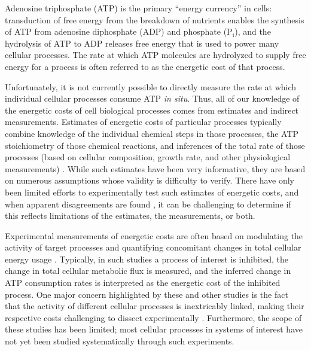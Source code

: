 \documentclass{compactarticle}
\begin{document}
Adenosine triphosphate (ATP) is the primary ``energy currency'' in cells: transduction of free energy from the breakdown of nutrients enables the synthesis of ATP from adenosine diphosphate (ADP) and phosphate (P$_\text{i}$), and the hydrolysis of ATP to ADP releases free energy that is used to power many cellular processes. The rate at which ATP molecules are hydrolyzed to supply free energy for a process is often referred to as the energetic cost of that process.

Unfortunately, it is not currently possible to directly measure the rate at which individual cellular processes consume ATP \textit{in situ}. Thus, all of our knowledge of the energetic costs of cell biological processes comes from estimates and indirect measurements. Estimates of energetic costs of particular processes typically combine knowledge of the individual chemical steps in those processes, the ATP stoichiometry of those chemical reactions, and inferences of the total rate of those processes (based on cellular composition, growth rate, and other physiological measurements) \cite{forrest1971generation,stouthamer1973theoretical,lynch2015bioenergetic}. While such estimates have been very informative, they are based on numerous assumptions whose validity is difficulty to verify. There have only been limited efforts to experimentally test such estimates of energetic costs, and when apparent disagreements are found \cite{waterlow1989energy,wieser2001hierarchies}, it can be challenging to determine if this reflects limitations of the estimates, the measurements, or both.


Experimental measurements of energetic costs are often based on modulating the activity of target processes and quantifying concomitant changes in total cellular energy usage \cite{smith1995protein,buttgereit1995hierarchy}. Typically, in such studies a process of interest is inhibited, the change in total cellular metabolic flux is measured, and the inferred change in ATP consumption rates is interpreted as the energetic cost of the inhibited process. One major concern highlighted by these and other studies is the fact that the activity of different cellular processes is inextricably linked, making their respective costs challenging to dissect experimentally \cite{wieser2001hierarchies}. Furthermore, the scope of these studies has been limited; most cellular processes in systems of interest have not yet been studied systematically through such experiments.
\end{document}
